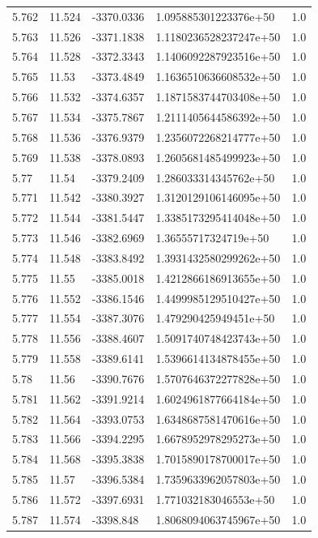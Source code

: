 \begin{tabular}{lllll}
5.762 & 11.524 & -3370.0336 & 1.095885301223376e+50 & 1.0 \\
5.763 & 11.526 & -3371.1838 & 1.1180236528237247e+50 & 1.0 \\
5.764 & 11.528 & -3372.3343 & 1.1406092287923516e+50 & 1.0 \\
5.765 & 11.53 & -3373.4849 & 1.1636510636608532e+50 & 1.0 \\
5.766 & 11.532 & -3374.6357 & 1.1871583744703408e+50 & 1.0 \\
5.767 & 11.534 & -3375.7867 & 1.2111405644586392e+50 & 1.0 \\
5.768 & 11.536 & -3376.9379 & 1.2356072268214777e+50 & 1.0 \\
5.769 & 11.538 & -3378.0893 & 1.2605681485499923e+50 & 1.0 \\
5.77 & 11.54 & -3379.2409 & 1.286033314345762e+50 & 1.0 \\
5.771 & 11.542 & -3380.3927 & 1.3120129106146095e+50 & 1.0 \\
5.772 & 11.544 & -3381.5447 & 1.3385173295414048e+50 & 1.0 \\
5.773 & 11.546 & -3382.6969 & 1.36555717324719e+50 & 1.0 \\
5.774 & 11.548 & -3383.8492 & 1.3931432580299262e+50 & 1.0 \\
5.775 & 11.55 & -3385.0018 & 1.4212866186913655e+50 & 1.0 \\
5.776 & 11.552 & -3386.1546 & 1.4499985129510427e+50 & 1.0 \\
5.777 & 11.554 & -3387.3076 & 1.479290425949451e+50 & 1.0 \\
5.778 & 11.556 & -3388.4607 & 1.5091740748423743e+50 & 1.0 \\
5.779 & 11.558 & -3389.6141 & 1.5396614134878455e+50 & 1.0 \\
5.78 & 11.56 & -3390.7676 & 1.5707646372277828e+50 & 1.0 \\
5.781 & 11.562 & -3391.9214 & 1.6024961877664184e+50 & 1.0 \\
5.782 & 11.564 & -3393.0753 & 1.6348687581470616e+50 & 1.0 \\
5.783 & 11.566 & -3394.2295 & 1.6678952978295273e+50 & 1.0 \\
5.784 & 11.568 & -3395.3838 & 1.7015890178700017e+50 & 1.0 \\
5.785 & 11.57 & -3396.5384 & 1.7359633962057803e+50 & 1.0 \\
5.786 & 11.572 & -3397.6931 & 1.771032183046553e+50 & 1.0 \\
5.787 & 11.574 & -3398.848 & 1.8068094063745967e+50 & 1.0 \\

\end{tabular}
